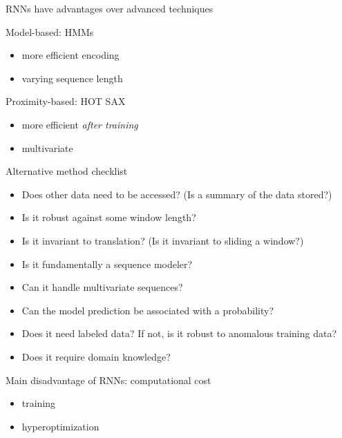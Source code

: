 \documentclass{beamer}
\begin{document}
    \begin{frame}{RNNs have advantages over advanced techniques}

      Model-based: HMMs
      \begin{itemize}
        \item more efficient encoding
        \item varying sequence length
      \end{itemize}

      Proximity-based: HOT SAX
      \begin{itemize}
        \item more efficient \emph{after training}
        \item multivariate
      \end{itemize}

    \end{frame}


    \begin{frame}{Alternative method checklist}

      \begin{itemize}
      \item Does other data need to be accessed?%
        (Is a summary of the data stored?)

      \item Is it robust against some window length?

      \item Is it invariant to translation? (Is it invariant to sliding a window?)

      \item Is it fundamentally a sequence modeler?

      \item Can it handle multivariate sequences?

      \item Can the model prediction be associated with a probability?

      \item Does it need labeled data? If not, is it robust to anomalous training data?

      \item Does it require domain knowledge?

      \end{itemize}

    \end{frame}


    \begin{frame}{Main disadvantage of RNNs: computational cost}
      \begin{itemize}
        \item training
        \item hyperoptimization
      \end{itemize}
        
    \end{frame}
\end{document}
